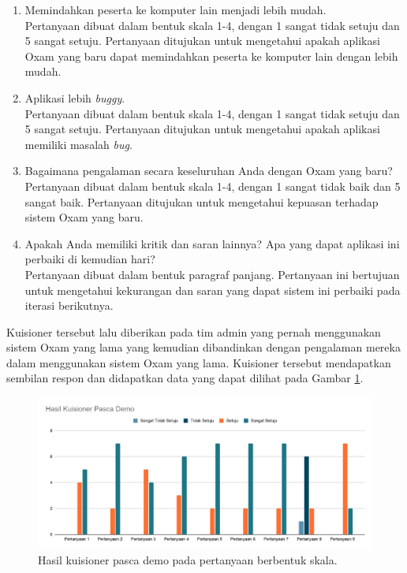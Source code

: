 \begin{enumerate}
        \item Memindahkan peserta ke komputer lain menjadi lebih mudah. \\
            Pertanyaan dibuat dalam bentuk skala 1-4, dengan 1 sangat tidak setuju dan 5 sangat setuju.
            Pertanyaan ditujukan untuk mengetahui apakah aplikasi Oxam yang baru dapat memindahkan
            peserta ke komputer lain dengan lebih mudah.
        
        
        \item Aplikasi lebih \textit{buggy}. \\
            Pertanyaan dibuat dalam bentuk skala 1-4, dengan 1 sangat tidak setuju dan 5 sangat setuju.
            Pertanyaan ditujukan untuk mengetahui apakah aplikasi memiliki masalah \textit{bug}.
        
        
        \item Bagaimana pengalaman secara keseluruhan Anda dengan Oxam yang baru? \\
            Pertanyaan dibuat dalam bentuk skala 1-4, dengan 1 sangat tidak baik dan 5 sangat baik.
            Pertanyaan ditujukan untuk mengetahui kepuasan terhadap sistem Oxam yang baru.
        
        
        \item Apakah Anda memiliki kritik dan saran lainnya? Apa yang dapat aplikasi ini perbaiki di kemudian hari? \\
            Pertanyaan dibuat dalam bentuk paragraf panjang. Pertanyaan ini bertujuan untuk mengetahui
            kekurangan dan saran yang dapat sistem ini perbaiki pada iterasi berikutnya.
    \end{enumerate}
    
    Kuisioner tersebut lalu diberikan pada tim admin yang pernah menggunakan sistem Oxam yang lama yang kemudian
    dibandinkan dengan pengalaman mereka dalam menggunakan sistem Oxam yang lama. Kuisioner tersebut mendapatkan
    sembilan respon dan didapatkan data yang dapat dilihat pada Gambar \ref{fig:kuisioner_demo}.
    \begin{figure}
        \centering
        \includegraphics[width=0.75\paperwidth]{Gambar/Hasil Kuisioner.pdf}
        \caption{Hasil kuisioner pasca demo pada pertanyaan berbentuk skala.}
        \label{fig:kuisioner_demo}
    \end{figure}
    
